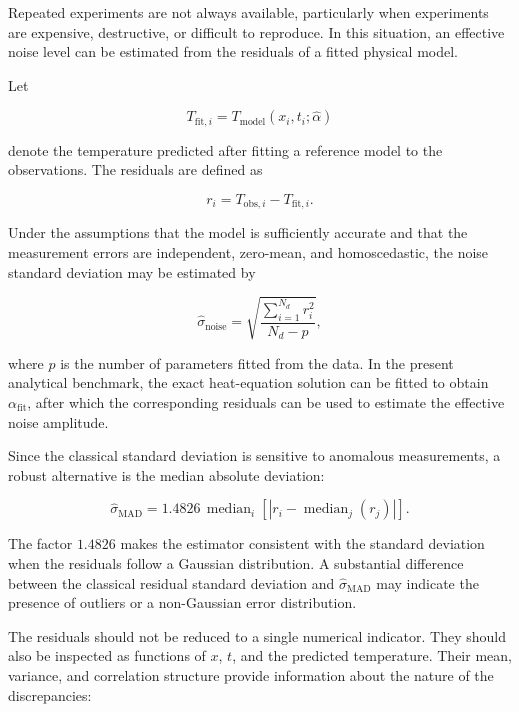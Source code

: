 Repeated experiments are not always available, particularly when experiments
are expensive, destructive, or difficult to reproduce. In this situation, an
effective noise level can be estimated from the residuals of a fitted physical
model.

Let

\begin{equation}
T_{\mathrm{fit},i}
=
T_{\mathrm{model}}
\left(
x_i,t_i;\widehat{\alpha}
\right)
\end{equation}

denote the temperature predicted after fitting a reference model to the
observations. The residuals are defined as

\begin{equation}
r_i
=
T_{\mathrm{obs},i}
-
T_{\mathrm{fit},i}.
\end{equation}

Under the assumptions that the model is sufficiently accurate and that the
measurement errors are independent, zero-mean, and homoscedastic, the noise
standard deviation may be estimated by

\begin{equation}
\widehat{\sigma}_{\mathrm{noise}}
=
\sqrt{
\frac{
\displaystyle
\sum_{i=1}^{N_d}r_i^2
}{
N_d-p
}
},
\end{equation}

where $p$ is the number of parameters fitted from the data. In the present
analytical benchmark, the exact heat-equation solution can be fitted to obtain
$\alpha_{\mathrm{fit}}$, after which the corresponding residuals can be used
to estimate the effective noise amplitude.

Since the classical standard deviation is sensitive to anomalous measurements,
a robust alternative is the median absolute deviation:

\begin{equation}
\widehat{\sigma}_{\mathrm{MAD}}
=
1.4826\,
\operatorname{median}_{i}
\left[
\left|
r_i
-
\operatorname{median}_{j}(r_j)
\right|
\right].
\end{equation}

The factor $1.4826$ makes the estimator consistent with the standard deviation
when the residuals follow a Gaussian distribution. A substantial difference
between the classical residual standard deviation and
$\widehat{\sigma}_{\mathrm{MAD}}$ may indicate the presence of outliers or a
non-Gaussian error distribution.

The residuals should not be reduced to a single numerical indicator. They
should also be inspected as functions of $x$, $t$, and the predicted
temperature. Their mean, variance, and correlation structure provide
information about the nature of the discrepancies:


